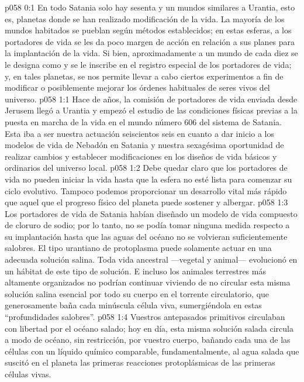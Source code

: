 \author{Portador de vida}
\vs p058 0:1 En todo Satania solo hay sesenta y un mundos similares a Urantia, esto es, planetas donde se han realizado modificación de la vida. La mayoría de los mundos habitados se pueblan según métodos establecidos; en estas esferas, a los portadores de vida se les da poco margen de acción en relación a sus planes para la implantación de la vida. Si bien, aproximadamente a un mundo de cada diez se le designa como  y se le inscribe en el registro especial de los portadores de vida; y, en tales planetas, se nos permite llevar a cabo ciertos experimentos a fin de modificar o posiblemente mejorar los órdenes habituales de seres vivos del universo.
\vs p058 1:1 Hace  de años, la comisión de portadores de vida enviada desde Jerusem llegó a Urantia y empezó el estudio de las condiciones físicas previas a la puesta en marcha de la vida en el mundo número 606 del sistema de Satania. Esta iba a ser nuestra actuación seiscientos seis en cuanto a dar inicio a los modelos de vida de Nebadón en Satania y nuestra sexagésima oportunidad de realizar cambios y establecer modificaciones en los diseños de vida básicos y ordinarios del universo local.
\vs p058 1:2 \pc Debe quedar claro que los portadores de vida no pueden iniciar la vida hasta que la esfera no esté lista para comenzar su ciclo evolutivo. Tampoco podemos proporcionar un desarrollo vital más rápido que aquel que el progreso físico del planeta puede sostener y albergar.
\vs p058 1:3 Los portadores de vida de Satania habían diseñado un modelo de vida compuesto de cloruro de sodio; por lo tanto, no se podía tomar ninguna medida respecto a su implantación hasta que las aguas del océano no se volvieran suficientemente salobres. El tipo urantiano de protoplasma puede solamente actuar en una adecuada solución salina. Toda vida ancestral ---vegetal y animal--- evolucionó en un hábitat de este tipo de solución. E incluso los animales terrestres más altamente organizados no podrían continuar viviendo de no circular esta misma solución salina esencial por todo su cuerpo en el torrente circulatorio, que generosamente baña cada minúscula célula viva, sumergiéndola en estas “profundidades salobres”.
\vs p058 1:4 Vuestros antepasados primitivos circulaban con libertad por el océano salado; hoy en día, esta misma solución salada circula a modo de océano, sin restricción, por vuestro cuerpo, bañando cada una de las células con un líquido químico comparable, fundamentalmente, al agua salada que suscitó en el planeta las primeras reacciones protoplásmicas de las primeras células vivas.
